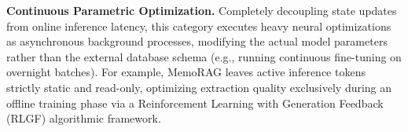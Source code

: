 
\noindent {} \textbf{Continuous Parametric Optimization.}
Completely decoupling state updates from online inference latency, this category executes heavy neural optimizations as asynchronous background processes, modifying the actual model parameters rather than the external database schema (e.g., running continuous fine-tuning on overnight batches).
For example, MemoRAG leaves active inference tokens strictly static and read-only, optimizing extraction quality exclusively during an offline training phase via a Reinforcement Learning with Generation Feedback (RLGF) algorithmic framework. 

